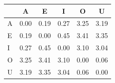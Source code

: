 \begin{tabular}{lccccc}
\toprule
\rowcolor{col01}
 & A & E & I & O & U \\
\midrule
A & 0.00 & 0.19 & 0.27 & 3.25 & 3.19 \\
E & 0.19 & 0.00 & 0.45 & 3.41 & 3.35 \\
I & 0.27 & 0.45 & 0.00 & 3.10 & 3.04 \\
O & 3.25 & 3.41 & 3.10 & 0.00 & 0.06 \\
U & 3.19 & 3.35 & 3.04 & 0.06 & 0.00 \\
\bottomrule
\end{tabular}
